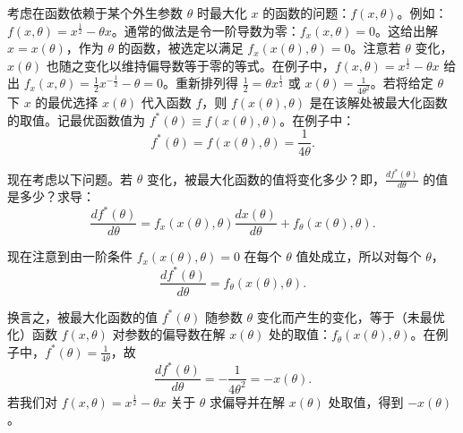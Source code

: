 \begin{translation}
考虑在函数依赖于某个外生参数 $\theta$ 时最大化 $x$ 的函数的问题：$f(x,\theta)$。例如：$f(x,\theta) = x^{\frac{1}{2}} - \theta x$。通常的做法是令一阶导数为零：$f_x(x,\theta) = 0$。这给出解 $x = x(\theta)$，作为 $\theta$ 的函数，被选定以满足 $f_x(x(\theta),\theta) = 0$。注意若 $\theta$ 变化，$x(\theta)$ 也随之变化以维持偏导数等于零的等式。在例子中，$f(x,\theta) = x^{\frac{1}{2}} - \theta x$ 给出 $f_x(x,\theta) = \frac{1}{2}x^{-\frac{1}{2}} - \theta = 0$。重新排列得 $\frac{1}{2} = \theta x^{\frac{1}{2}}$ 或 $x(\theta) = \frac{1}{4\theta^2}$。若将给定 $\theta$ 下 $x$ 的最优选择 $x(\theta)$ 代入函数 $f$，则 $f(x(\theta),\theta)$ 是在该解处被最大化函数的取值。记最优函数值为 $f^*(\theta) \equiv f(x(\theta),\theta)$。在例子中：
\[
f^*(\theta) = f(x(\theta),\theta) = \frac{1}{4\theta}.
\]

现在考虑以下问题。若 $\theta$ 变化，被最大化函数的值将变化多少？即，$\frac{df^*(\theta)}{d\theta}$ 的值是多少？求导：
\[
\frac{df^*(\theta)}{d\theta} = f_x(x(\theta),\theta)\frac{dx(\theta)}{d\theta} + f_\theta(x(\theta),\theta).
\]

现在注意到由一阶条件 $f_x(x(\theta),\theta) = 0$ 在每个 $\theta$ 值处成立，所以对每个 $\theta$，
\[
\frac{df^*(\theta)}{d\theta} = f_\theta(x(\theta),\theta).
\]

换言之，被最大化函数的值 $f^*(\theta)$ 随参数 $\theta$ 变化而产生的变化，等于（未最优化）函数 $f(x,\theta)$ 对参数的偏导数在解 $x(\theta)$ 处的取值：$f_\theta(x(\theta),\theta)$。在例子中，$f^*(\theta) = \frac{1}{4\theta}$，故
\[
\frac{df^*(\theta)}{d\theta} = -\frac{1}{4\theta^2} = -x(\theta).
\]
若我们对 $f(x,\theta) = x^{\frac{1}{2}} - \theta x$ 关于 $\theta$ 求偏导并在解 $x(\theta)$ 处取值，得到 $-x(\theta)$。
\end{translation}

